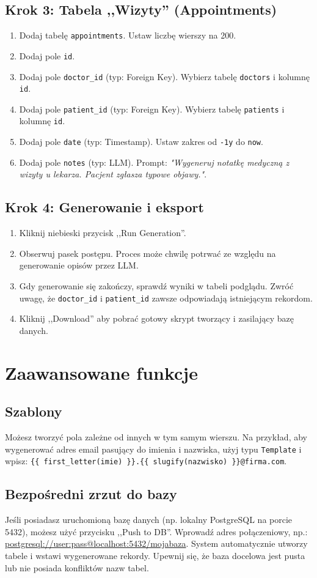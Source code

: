 \subsection*{Krok 3: Tabela ,,Wizyty'' (Appointments)}
\begin{enumerate}
    \item Dodaj tabelę \texttt{appointments}. Ustaw liczbę wierszy na 200.
    \item Dodaj pole \texttt{id}.
    \item Dodaj pole \texttt{doctor\_id} (typ: Foreign Key). Wybierz tabelę \texttt{doctors} i kolumnę \texttt{id}.
    \item Dodaj pole \texttt{patient\_id} (typ: Foreign Key). Wybierz tabelę \texttt{patients} i kolumnę \texttt{id}.
    \item Dodaj pole \texttt{date} (typ: Timestamp). Ustaw zakres od \texttt{-1y} do \texttt{now}.
    \item Dodaj pole \texttt{notes} (typ: \gls{LLM}). Prompt: \emph{"Wygeneruj notatkę medyczną z wizyty u lekarza. Pacjent zgłasza typowe objawy."}.
\end{enumerate}

\subsection*{Krok 4: Generowanie i eksport}
\begin{enumerate}
    \item Kliknij niebieski przycisk ,,Run Generation''.
    \item Obserwuj pasek postępu. Proces może chwilę potrwać ze względu na generowanie opisów przez \gls{LLM}.
    \item Gdy generowanie się zakończy, sprawdź wyniki w tabeli podglądu. Zwróć uwagę, że \texttt{doctor\_id} i \texttt{patient\_id} zawsze odpowiadają istniejącym rekordom.
    \item Kliknij ,,Download'' aby pobrać gotowy skrypt tworzący i zasilający bazę danych.
\end{enumerate}

\section*{Zaawansowane funkcje}
\subsection*{Szablony}
Możesz tworzyć pola zależne od innych w tym samym wierszu. Na przykład, aby wygenerować adres email pasujący do imienia i nazwiska, użyj typu \texttt{Template} i wpisz:
\texttt{\{\{ first\_letter(imie) \}\}.\{\{ slugify(nazwisko) \}\}@firma.com}.

\subsection*{Bezpośredni zrzut do bazy}
Jeśli posiadasz uruchomioną bazę danych (np. lokalny PostgreSQL na porcie 5432), możesz użyć przycisku ,,Push to DB''. Wprowadź adres połączeniowy, np.:
\url{postgresql://user:pass@localhost:5432/mojabaza}.
System automatycznie utworzy tabele i wstawi wygenerowane rekordy. Upewnij się, że baza docelowa jest pusta lub nie posiada konfliktów nazw tabel.
